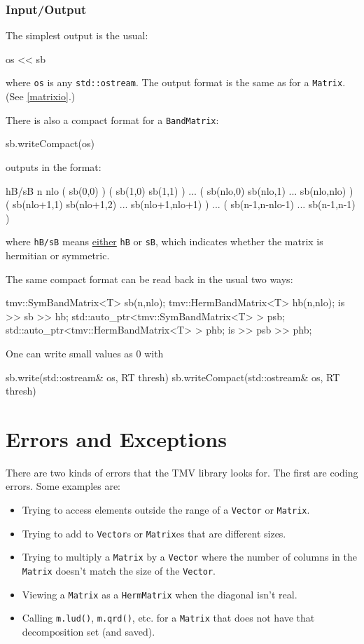 \documentclass[twoside,letterpaper,11pt]{article}
\renewcommand{\tt}[1]{{\lstinline {#1}}}
\begin{document}
\subsubsection{Input/Output}

The simplest output is the usual:
\begin{tmvcode}
os << sb
\end{tmvcode}
where \tt{os} is any \tt{std::ostream}.
The output format is the same as for a \tt{Matrix}.
(See \ref{matrixio}.)

There is also a compact format for a \tt{BandMatrix}:
\begin{tmvcode}
sb.writeCompact(os)
\end{tmvcode}
outputs in the format:
\begin{tmvcode}
hB/sB n nlo
( sb(0,0)  )
( sb(1,0)  sb(1,1)  )
...
( sb(nlo,0)  sb(nlo,1) ...  sb(nlo,nlo) )
( sb(nlo+1,1)  sb(nlo+1,2) ...  sb(nlo+1,nlo+1) )
...
( sb(n-1,n-nlo-1)  ... sb(n-1,n-1) )
\end{tmvcode}
where \tt{hB/sB} means \underline{either} \tt{hB} or \tt{sB}, 
which indicates whether the matrix is hermitian or symmetric.

The same compact format can be read back in the usual two ways:
\begin{tmvcode}
tmv::SymBandMatrix<T> sb(n,nlo);
tmv::HermBandMatrix<T> hb(n,nlo);
is >> sb >> hb;
std::auto_ptr<tmv::SymBandMatrix<T> > psb;
std::auto_ptr<tmv::HermBandMatrix<T> > phb;
is >> psb >> phb;
\end{tmvcode}

One can write small values as 0 with
\begin{tmvcode}
sb.write(std::ostream& os, RT thresh)
sb.writeCompact(std::ostream& os, RT thresh)
\end{tmvcode}

\newpage
\section{Errors and Exceptions}
\label{error}

There are two kinds of errors that the TMV library looks for.  The first are 
coding errors.  Some examples are:
\begin{itemize}
\item
Trying to access elements outside the range of a \tt{Vector} or \tt{Matrix}.
\item
Trying to add to \tt{Vector}s or \tt{Matrix}es that are different sizes.
\item
Trying to multiply a \tt{Matrix} by a \tt{Vector} where the number of columns 
in the \tt{Matrix} doesn't match the size of the \tt{Vector}.
\item
Viewing a \tt{Matrix} as a \tt{HermMatrix} when the diagonal isn't real.
\item
Calling \tt{m.lud()}, \tt{m.qrd()}, etc. for a \tt{Matrix} that does not have that 
decomposition set (and saved).
\end{itemize}
\end{document}
